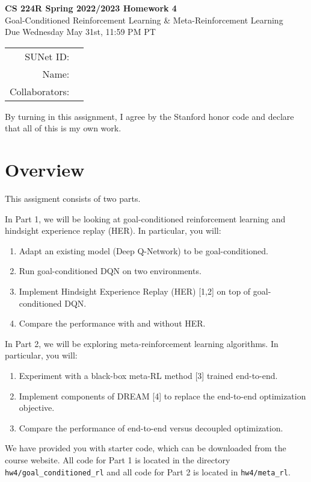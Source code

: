 \documentclass[12pt]{article}
\begin{document}
\begin{center}
{\Large \textbf{CS 224R Spring 2022/2023 Homework 4} \\ Goal-Conditioned Reinforcement Learning \& Meta-Reinforcement Learning
\\ 
\vspace{0.2cm}
Due Wednesday May 31st, 11:59 PM PT}

\begin{tabular}{rl}
SUNet ID: &  \\
Name: & \\
Collaborators: & 
\end{tabular}
\end{center}

By turning in this assignment, I agree by the Stanford honor code and declare that all of this is my own work.

\section*{Overview}
This assigment consists of two parts. 

In Part 1, we will be looking at goal-conditioned reinforcement learning and hindsight experience replay (HER). In particular, you will:

\begin{enumerate}
    \item Adapt an existing model (Deep Q-Network) to be goal-conditioned.
    \item Run goal-conditioned DQN on two environments.
    \item Implement Hindsight Experience Replay (HER) [1,2] on top of goal-conditioned DQN.
    \item Compare the performance with and without HER.
\end{enumerate}


In Part 2, we will be exploring meta-reinforcement learning algorithms. In particular, you will:

\begin{enumerate}
    \item Experiment with a black-box meta-RL method [3] trained end-to-end.
    \item Implement components of DREAM [4] to replace the end-to-end optimization objective.
    \item Compare the performance of end-to-end versus decoupled optimization.
\end{enumerate}


\noindent We have provided you with starter code, which can be downloaded from the course website. All code for Part 1 is located in the directory \texttt{hw4/goal\_conditioned\_rl} and all code for Part 2 is located in \texttt{hw4/meta\_rl}.
\end{document}
